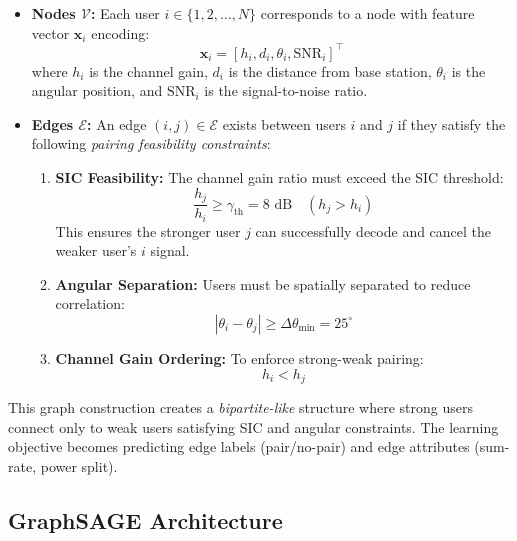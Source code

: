 \begin{itemize}
    \item \textbf{Nodes $\mathcal{V}$:} Each user $i \in \{1, 2, \ldots, N\}$ corresponds to a node with feature vector $\mathbf{x}_i$ encoding:
    \begin{equation}
    \mathbf{x}_i = [h_i, d_i, \theta_i, \text{SNR}_i]^\top
    \end{equation}
    where $h_i$ is the channel gain, $d_i$ is the distance from base station, $\theta_i$ is the angular position, and $\text{SNR}_i$ is the signal-to-noise ratio.
    
    \item \textbf{Edges $\mathcal{E}$:} An edge $(i, j) \in \mathcal{E}$ exists between users $i$ and $j$ if they satisfy the following \emph{pairing feasibility constraints}:
    \begin{enumerate}
        \item \textbf{SIC Feasibility:} The channel gain ratio must exceed the SIC threshold:
        \begin{equation}
        \frac{h_j}{h_i} \geq \gamma_{\text{th}} = 8 \text{ dB} \quad (h_j > h_i)
        \end{equation}
        This ensures the stronger user $j$ can successfully decode and cancel the weaker user's $i$ signal.
        
        \item \textbf{Angular Separation:} Users must be spatially separated to reduce correlation:
        \begin{equation}
        |\theta_i - \theta_j| \geq \Delta\theta_{\text{min}} = 25^\circ
        \end{equation}
        
        \item \textbf{Channel Gain Ordering:} To enforce strong-weak pairing:
        \begin{equation}
        h_i < h_j
        \end{equation}
    \end{enumerate}
\end{itemize}

This graph construction creates a \emph{bipartite-like} structure where strong users connect only to weak users satisfying SIC and angular constraints. The learning objective becomes predicting edge labels (pair/no-pair) and edge attributes (sum-rate, power split).

\subsection{GraphSAGE Architecture}

